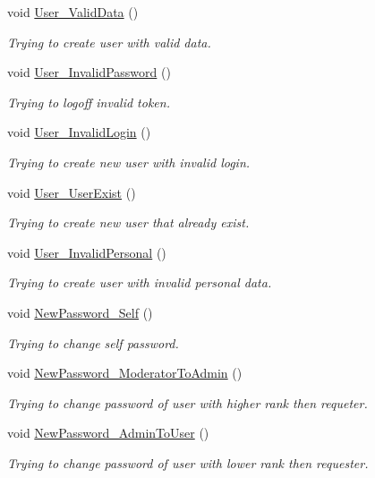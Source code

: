 \begin{DoxyCompactItemize}
void \mbox{\hyperlink{class_a_c_tests_1_1_tests_1_1_queries_a3245bf7b7292d12608b40819fe7839fe}{User\+\_\+\+Valid\+Data}} ()
\begin{DoxyCompactList}\small\item\em Trying to create user with valid data. \end{DoxyCompactList}\item 
void \mbox{\hyperlink{class_a_c_tests_1_1_tests_1_1_queries_a31de34a9e5ae4fd570c28c76a733f7a6}{User\+\_\+\+Invalid\+Password}} ()
\begin{DoxyCompactList}\small\item\em Trying to logoff invalid token. \end{DoxyCompactList}\item 
void \mbox{\hyperlink{class_a_c_tests_1_1_tests_1_1_queries_a884d9f1c5de9054929456dc3d5439dcd}{User\+\_\+\+Invalid\+Login}} ()
\begin{DoxyCompactList}\small\item\em Trying to create new user with invalid login. \end{DoxyCompactList}\item 
void \mbox{\hyperlink{class_a_c_tests_1_1_tests_1_1_queries_ad06fcb257c730cd383f3484417c65a19}{User\+\_\+\+User\+Exist}} ()
\begin{DoxyCompactList}\small\item\em Trying to create new user that already exist. \end{DoxyCompactList}\item 
void \mbox{\hyperlink{class_a_c_tests_1_1_tests_1_1_queries_a0b53e9f54f2e773bf1a739b84afb7d1b}{User\+\_\+\+Invalid\+Personal}} ()
\begin{DoxyCompactList}\small\item\em Trying to create user with invalid personal data. \end{DoxyCompactList}\item 
void \mbox{\hyperlink{class_a_c_tests_1_1_tests_1_1_queries_a6e0f0bb08cea34e8e078acdb761f05ab}{New\+Password\+\_\+\+Self}} ()
\begin{DoxyCompactList}\small\item\em Trying to change self password. \end{DoxyCompactList}\item 
void \mbox{\hyperlink{class_a_c_tests_1_1_tests_1_1_queries_ac81c93c61298ffc263b71fe56df8c8a1}{New\+Password\+\_\+\+Moderator\+To\+Admin}} ()
\begin{DoxyCompactList}\small\item\em Trying to change password of user with higher rank then requeter. \end{DoxyCompactList}\item 
void \mbox{\hyperlink{class_a_c_tests_1_1_tests_1_1_queries_a1d5aa95d71f72e884b88af411915a8c4}{New\+Password\+\_\+\+Admin\+To\+User}} ()
\begin{DoxyCompactList}\small\item\em Trying to change password of user with lower rank then requester. \end{DoxyCompactList}\end{DoxyCompactItemize}
